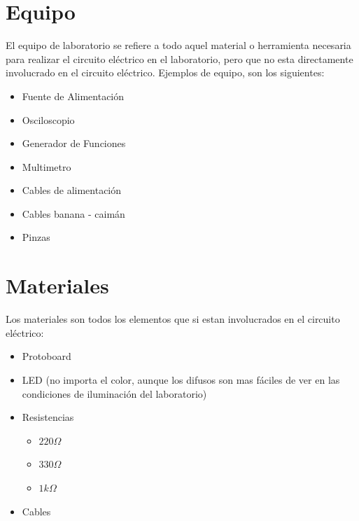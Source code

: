 
\section{Equipo}

	El equipo de laboratorio se refiere a todo aquel material o herramienta necesaria para realizar el circuito eléctrico en el laboratorio, pero que no esta directamente involucrado en el circuito eléctrico. Ejemplos de equipo, son los siguientes:

	\begin{itemize}
		\item Fuente de Alimentación
		\item Osciloscopio
		\item Generador de Funciones
		\item Multimetro
		\item Cables de alimentación
		\item Cables banana - caimán
		\item Pinzas
	\end{itemize}


\section{Materiales}

	Los materiales son todos los elementos que si estan involucrados en el circuito eléctrico:

	\begin{itemize}
		\item Protoboard
		\item LED (no importa el color, aunque los difusos son mas fáciles de ver en las condiciones de iluminación del laboratorio)
		\item Resistencias
		\begin{itemize}
			\item $220 \Omega$
			\item $330 \Omega$
			\item $1 k\Omega$
		\end{itemize}
		\item Cables
	\end{itemize}

